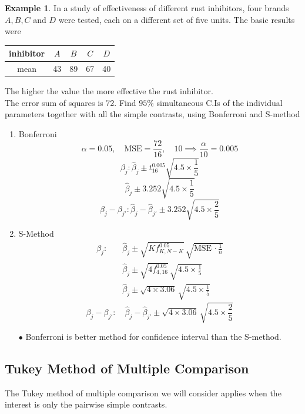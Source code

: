 \documentclass[11pt,a4paper]{article}
\theoremstyle{definition}
\newtheorem{exa}[thm]{Example}
\begin{document}
\begin{exa}\label{res:exa:2.3.7}
In a study of effectiveness of different rust inhibitors, four brands $A,B,C$ and $D$ were tested, each on a different set of five units. The basic results were 

\begin{table}[h!]
\centering
\begin{tabular}{c|cccc}
inhibitor & $A$ & $B$ & $C$ & $D$\\
\hline
mean & 43 & 89 & 67 & 40\\
\end{tabular}
\end{table}

The higher the value the more effective the rust inhibitor.\\

The error sum of squares is 72. Find $95\%$ simultaneous C.Is of the individual parameters together with all the simple contrasts, using Bonferroni and S-method

\begin{enumerate}
\item Bonferroni
$$\alpha = 0.05,\quad  \text{MSE} = \frac{72}{16},\quad  10\implies \frac{\alpha}{10}=0.005$$
$$\beta_j : \hat{\beta}_j \pm t^{0.005}_{16}\sqrt{4.5\times \frac{1}{5}}$$
$$\hat{\beta}_j\pm 3.252\sqrt{4.5\times \frac{1}{5}}$$
$$\beta_j-\beta_{j'}: \hat{\beta}_j-\hat{\beta}_{j'}\pm 3.252\sqrt{4.5\times \frac{2}{5}}$$



\item S-Method
\begin{align*}
\beta_j:\quad  & \widehat{\beta}_j \pm \sqrt{Kf^{0.05}_{K,N-K}}\,\sqrt{\text{MSE}\,\cdot \frac{1}{n}}\\
         &  \widehat{\beta}_j \pm \sqrt{4f^{0.05}_{4,16}}\,\sqrt{4.5\times \frac{1}{5}}\\
           & \widehat{\beta}_j \pm \sqrt{4\times 3.06}\,\sqrt{4.5\times \frac{1}{5}}
\end{align*}
$$\beta_j-\beta_{j'}:\quad  \widehat{\beta}_j-\widehat{\beta}_{j'} \pm \sqrt{4\times 3.06}\,\sqrt{4.5\times \frac{2}{5}}$$

$\bullet$ Bonferroni is better method for confidence interval than the S-method.\\
\end{enumerate} 
\end{exa}


\subsection*{Tukey Method of Multiple Comparison}
The Tukey method of multiple comparison we will consider applies when the interest is only the pairwise simple contrasts.\\
\end{document}
